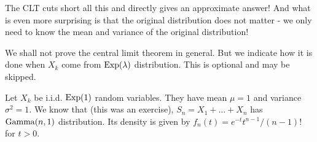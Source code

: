 \documentclass[preprint,  11pt]{amsart}
\def\sig{{\sigma}}
\begin{document}
The CLT cuts short all this and directly gives an approximate answer! And what is even more surprising is that the original distribution does not matter - we only need to know the mean and variance of the original distribution!
\eeg
%


%


We shall not prove the central limit theorem in general. But we indicate how it is done when $X_{k}$ come from $\mbox{Exp}(\lambda)$ distribution. This is optional and may be skipped.

 Let $X_{k}$ be i.i.d. $\mbox{Exp}(1)$ random variables. They have mean $\mu=1$ and variance $\sig^{2}=1$. We know that (this was an exercise), $S_{n}=X_{1}+\ldots +X_{n}$ has $\mbox{Gamma}(n,1)$ distribution. Its density is given by $f_{n}(t)=e^{-t}t^{n-1}/(n-1)!$ for $t>0$.
\end{document}
